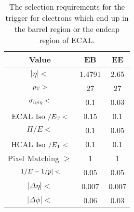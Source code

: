 \begin{table}[h]
\centering
\label{table:wp80}
\begin{center}
    \begin{tabular}{ | c | c | c |} \hline
        Value                      & EB     & EE     \\ \hline
        $|\eta| <$                 & 1.4791 & 2.65   \\
        $p_{\mathrm{T}} >$                    & 27     & 27     \\
        $\sigma_{i \eta i \eta} <$         & 0.1    & 0.03   \\
        ECAL Iso $/ E_{\mathrm{T}} <$         & 0.15   & 0.1    \\
        $H/E <$                    & 0.1    & 0.05   \\
        HCAL Iso $/ E_{\mathrm{T}} <$         & 0.1    & 0.1    \\
        Pixel Matching $\ge$       & 1      & 1      \\
        $|1/E - 1/p| <$              & 0.05   & 0.05   \\
        $|\Delta \eta| <$          & 0.007  & 0.007  \\
        $|\Delta \phi| <$          & 0.06   & 0.03   \\ \hline
    \end{tabular}
\end{center}
\caption{
    The selection requirements for the \SingleElectronTrigger trigger for
    electrons which end up in the barrel region or the endcap region of ECAL.
}
\end{table}

